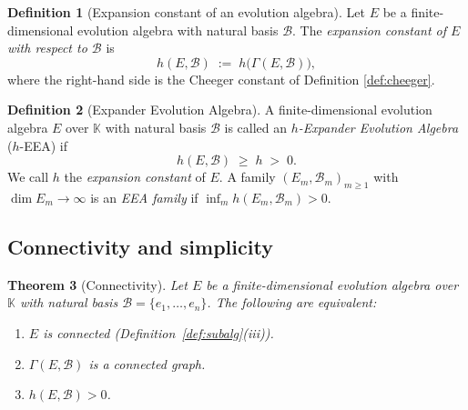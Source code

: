 \documentclass[12pt,a4paper]{amsart}
\newtheorem{theorem}{Theorem}[section]
\theoremstyle{definition}
\newtheorem{definition}[theorem]{Definition}
\newcommand{\K}{\mathbb{K}}
\newcommand{\hh}{h}          %
\newcommand{\EA}{E}          %
\newcommand{\natbasis}{\mathcal{B}}  %
\begin{document}
\begin{definition}[Expansion constant of an evolution algebra]\label{def:ea-cheeger}
Let $\EA$ be a finite-dimensional evolution algebra with natural basis
$\natbasis$.  The \emph{expansion constant of $\EA$ with respect to
$\natbasis$} is
\[
  \hh(\EA,\natbasis) \;:=\; \hh\!\bigl(\varGamma(\EA,\natbasis)\bigr),
\]
where the right-hand side is the Cheeger constant of Definition
\ref{def:cheeger}.
\end{definition}

\begin{definition}[Expander Evolution Algebra]\label{def:EEA}
A finite-dimensional evolution algebra $\EA$ over $\K$ with natural
basis $\natbasis$ is called an \emph{$h$-Expander Evolution Algebra}
($h$-EEA) if
\[
  \hh(\EA,\natbasis) \;\ge\; h \;>\; 0.
\]
We call $h$ the \emph{expansion constant} of $\EA$.  A family
$(\EA_m,\natbasis_m)_{m\ge 1}$ with $\dim\EA_m\to\infty$ is an
\emph{EEA family} if $\inf_m \hh(\EA_m,\natbasis_m)>0$.
\end{definition}

\subsection{Connectivity and simplicity}\label{sub:connectivity}

\begin{theorem}[Connectivity]\label{thm:connectivity}
Let $\EA$ be a finite-dimensional evolution algebra over $\K$ with
natural basis $\natbasis=\{e_1,\ldots,e_n\}$.  The following are
equivalent:
\begin{enumerate}[label=\normalfont(\roman*)]
  \item $\EA$ is connected (Definition~\ref{def:subalg}(iii)).
  \item $\varGamma(\EA,\natbasis)$ is a connected graph.
  \item $\hh(\EA,\natbasis)>0$.
\end{enumerate}
\end{theorem}
\end{document}

